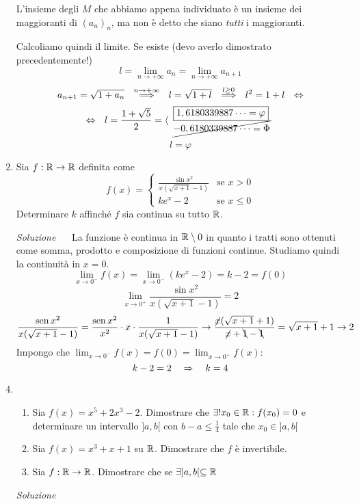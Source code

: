 \documentclass{article}
\begin{document}
\begin{enumerate}[label=\textbf{Esercizio 6.\arabic*.},itemindent=*]
\begin{oss}
        L'insieme degli $M$ che abbiamo appena individuato è un insieme dei maggioranti di $(a_n)_n$, ma non è detto che siano \emph{tutti} i maggioranti.
    \end{oss}
    Calcoliamo quindi il limite. Se esiste (devo averlo dimostrato precedentemente!) \[l=\lim_{n\to+\infty}a_n=\lim_{n\to+\infty}a_{n+1}\]
    \[a_{n+1}=\sqrt{1+a_n}~~\overset{n\to+\infty}\Longrightarrow~~l=\sqrt{1+l}~~\overset{l\geq0}\Longrightarrow~~l^2=1+l~~\Harr\]
    \[\Harr~~l=\frac{1+\sqrt{5}}{2}=\langle\begin{array}{l}
        \boxed{1,6180339887\dots=\varphi}\\
        \cancel{-0,6180339887\dots=\Phi}
    \end{array}\]
    \[l=\varphi\]
    \item Sia $f: \R\to \R$ definita come \[f(x)=\begin{cases}
        \frac{\sin x^2}{x(\sqrt{x+1}-1)}&\text{se }x>0\\
        ke^x-2 & \text{se }x\leq 0
    \end{cases}\]
    Determinare $k$ affinché $f$ sia continua su tutto $\R$.
    \item[\textit{\large Soluzione~}]~
    La funzione è continua in $\R\setminus 0$ in quanto i tratti sono ottenuti come somma, prodotto e composizione di funzioni continue. Studiamo quindi la continuità in $x=0$.
    \[\lim_{x\to0^-}f(x)=\lim_{x\to0^-}(ke^x-2)=k-2=f(0)\]
    \[\lim_{x\to0^+}\frac{\sin x^2}{x(\sqrt{x+1}-1)}=2\]
    \[\frac{\sin x^2}{x(\sqrt{x+1}-1)}=\frac{\sin x^2}{x^2}\cdot x\cdot \frac{1}{x(\sqrt{x+1}-1)}\to\frac{\cancel{x}(\sqrt{x+1}+1)}{\cancel{x}+\bcancel{1}-\bcancel{1}}=\sqrt{x+1}+1\to 2\]
    Impongo che $\lim_{x\to0^-}f(x)=f(0)=\lim_{x\to0^+}f(x)$:
    \[k-2=2~~~\Rarr~~~k=4\]
\item ~
\begin{enumerate}
    \item Sia $f(x)=x^5+2x^3-2$. Dimostrare che $\exists!x_0\in \R:f(x_0)=0$ e determinare un intervallo $]a,b[$ con $\scriptstyle b-a\leq\frac{1}{4}$ tale che $x_0\in]a,b[$
    \item Sia $f(x)=x^3+x+1$ su $\R$. Dimostrare che $f$ è invertibile.
    \item Sia $f:\R\to\R$. Dimostrare che se $\exists ]a,b[\subseteq \R$
\end{enumerate}
\item[\textit{\large Soluzione~}]~

\end{enumerate}
\end{document}
